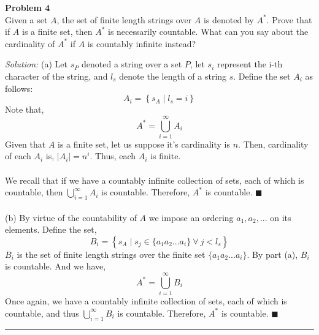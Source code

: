 \documentclass[a4paper, 11pt]{article}
\newenvironment{problem}[2][Problem]
    { \begin{mdframed}[backgroundcolor=gray!20] \textbf{#1 #2} \\}
    {  \end{mdframed}}
\newenvironment{solution}
    {\textit{Solution:}}
    {}
\newcommand{\hr}{\noindent\rule{7in}{2.8pt}}
\begin{document}
\begin{problem}{4}
Given a set $A$, the set of finite length strings over $A$ is denoted by $A^*$. Prove that if $A$ is a finite set, then $A^*$ is necessarily countable. What can you say about the cardinality of $A^*$ if $A$ is countably infinite instead?
\end{problem}
\begin{solution} (a) Let $s_P$ denoted a string over a set $P$, let $s_i$ represent the i-th character of the string, and $l_s$ denote the length of a string $s$. Define the set $A_i$ as follows:
$$A_i = \left \{s_A \mid l_s = i \right \} $$ 
Note that, $$A^* = \bigcup\limits_{i=1}^{\infty} A_{i} $$
Given that $A$ is a finite set, let us suppose it's cardinality is $n$. Then, cardinality of each $A_i$ is, $|A_i| = n^i$. Thus, each $A_i$ is finite.
\\
\\
We recall that if we have a countably infinite collection of sets, each of which is countable, then $\bigcup\limits_{i=1}^{\infty} A_{i}$ is countable. Therefore, $A^*$ is countable. $\blacksquare$
\\
\\
(b) By virtue of the countability of $A$ we impose an ordering $a_1, a_2, ...$ on its elements. Define the set, 
$$B_i = \left \{ s_A \mid s_j \in \{ a_1 a_2 ... a_i \} \ \forall \ j < l_s \right \} $$ 
$B_i$ is the set of finite length strings over the finite set $\{ a_1 a_2 ... a_i \}$. By part (a), $B_i$ is countable. And we have, 
$$A^* = \bigcup\limits_{i=1}^{\infty} B_{i} $$
Once again, we have a countably infinite collection of sets, each of which is countable, and thus $\bigcup\limits_{i=1}^{\infty} B_{i}$ is countable. Therefore, $A^*$ is countable. $\blacksquare$
\end{solution} 
\\
\hr
\end{document}

